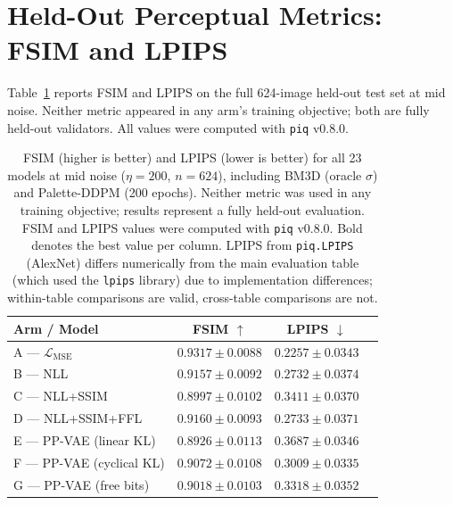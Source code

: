 \documentclass[12pt, a4paper, twoside, openright]{book}
\begin{document}
\section{Held-Out Perceptual Metrics: FSIM and LPIPS}
\label{sec:results:perceptual}

Table~\ref{tab:results:fsim} reports FSIM \cite{zhang_fsim_2011} and LPIPS \cite{zhang_unreasonable_2018} on the full 624-image held-out test set at mid noise. Neither metric appeared in any arm's training objective; both are fully held-out validators. All values were computed with \texttt{piq} v0.8.0.

\begin{table}[htbp]
\centering
\caption[Held-out perceptual metrics (FSIM and LPIPS) at mid noise]{FSIM (higher is better) and LPIPS (lower is better) for all 23 models at mid noise ($\eta{=}200$, $n{=}624$), including BM3D (oracle $\sigma$) and Palette-DDPM (200 epochs). Neither metric was used in any training objective; results represent a fully held-out evaluation. FSIM and LPIPS values were computed with \texttt{piq} v0.8.0. Bold denotes the best value per column. LPIPS from \texttt{piq.LPIPS} (AlexNet) differs numerically from the main evaluation table (which used the \texttt{lpips} library) due to implementation differences; within-table comparisons are valid, cross-table comparisons are not.}
\label{tab:results:fsim}
\small
\begin{tabular}{lccc}
\toprule
\textbf{Arm / Model} & \textbf{FSIM $\uparrow$} & \textbf{LPIPS $\downarrow$} \\
\midrule
A --- $\mathcal{L}_{\mathrm{MSE}}$      & $\mathbf{0.9317 \pm 0.0088}$ & $\mathbf{0.2257 \pm 0.0343}$ \\
B --- NLL                                & $0.9157 \pm 0.0092$          & $0.2732 \pm 0.0374$ \\
C --- NLL+SSIM                           & $0.8997 \pm 0.0102$          & $0.3411 \pm 0.0370$ \\
D --- NLL+SSIM+FFL                       & $0.9160 \pm 0.0093$          & $0.2733 \pm 0.0371$ \\
E --- PP-VAE (linear KL)                 & $0.8926 \pm 0.0113$          & $0.3687 \pm 0.0346$ \\
F --- PP-VAE (cyclical KL)               & $0.9072 \pm 0.0108$          & $0.3009 \pm 0.0335$ \\
G --- PP-VAE (free bits)                 & $0.9018 \pm 0.0103$          & $0.3318 \pm 0.0352$ \\

\end{tabular}
\end{table}
\end{document}

